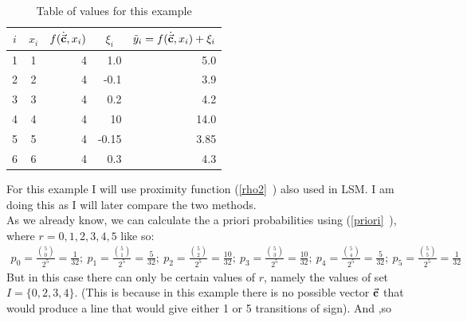 \begin{table}[h!]
\caption {Table of values for this example} \label{tab:title} 
\centering
\bgroup
\def\arraystretch{1.3}
\begin{tabular}{|c|c|r|r|r|}
\hline
$i$ & $x_{i}$ & \multicolumn{1}{c|}{$f(\dot{\vec{\textbf{c}}},x_{i})$} & \multicolumn{1}{c|}{$\xi_{i}$} & \multicolumn{1}{c|}{$\tilde{y}_{i}=f(\dot{\vec{\textbf{c}}},x_{i})+\xi_{i}$} \\ \hline
1   & 1       & 4                                           & 1.0                            & 5.0                                                               \\ \cline{1-2}
2   & 2       & 4                                           & -0.1                           & 3.9                                                               \\ \cline{1-2}
3   & 3       & 4                                           & 0.2                            & 4.2                                                               \\ \cline{1-2}
4   & 4       & 4                                           & 10                             & 14.0                                                              \\ \cline{1-2}
5   & 5       & 4                                           & -0.15                          & 3.85                                                              \\ \cline{1-2}
6   & 6       & 4                                           & 0.3                            & 4.3                                                               \\ \hline
\end{tabular}
\egroup
\end{table}
\noindent
For this example I will use proximity function (\vref{rho2}~) also used in LSM. I am doing this as I will later compare the two methods.\\
\noindent
As we already know, we can calculate the a priori probabilities using (\vref{priori}~), where $r=0,1,2,3,4,5$ like so:
\begin{gather*}
p_{0}= \frac{\binom {5}0}{2^{5}}=\frac{1}{32}; \ p_{1}=\frac{\binom {5}1}{2^{5}}= \frac{5}{32}; \ p_{2}=\frac{\binom {5}2}{2^{5}}= \frac{10}{32}; \ p_{3}=\frac{\binom {5}3}{2^{5}}= \frac{10}{32}; \ p_{4}=\frac{\binom {5}4}{2^{5}}= \frac{5}{32}; \ p_{5}=\frac{\binom {5}5}{2^{5}}= \frac{1}{32}
\end{gather*}
But in this case there can only be certain values of $r$, namely the values of set $I=\{0,2,3,4\}$. (This is because in this example there is no possible vector $\vec{\textbf{c}}$ that would produce a line that would give either 1 or 5 transitions of sign). And ,so 
